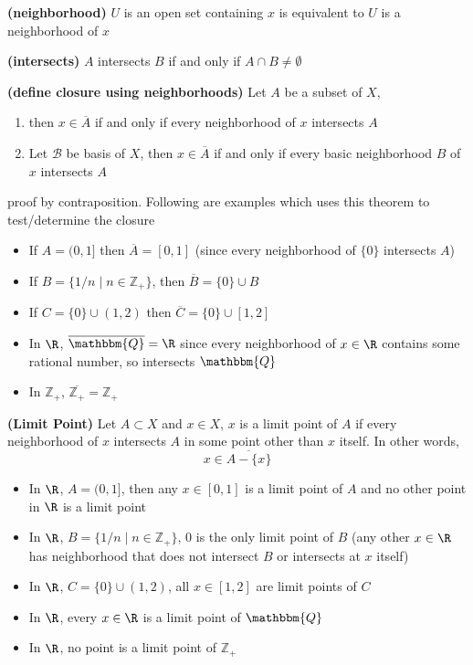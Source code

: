\documentclass[10.5pt]{article}
\newcommand{\Z}{\mathbb{Z}}
\newcommand{\calB}{\mathcal{B}}
\newcommand{\Q}{\mathbbm{Q}}
\begin{document}
\begin{defn*}
    \textbf{(neighborhood)} $U$ is an open set containing $x$ is equivalent to $U$ is a neighborhood of $x$ 
\end{defn*}

\begin{defn*}
    \textbf{(intersects)} $A$ intersects $B$ if and only if $A\cap B\neq \emptyset$
\end{defn*}

\begin{theorem*} \textbf{(define closure using neighborhoods)}
    Let $A$ be a subset of $X$,
    \begin{enumerate}
        \item then $x\in \overline{A}$ if and only if every neighborhood of $x$ intersects $A$
        \item Let $\calB$ be basis of $X$, then $x\in \overline{A}$ if and only if every basic neighborhood $B$ of $x$ intersects $A$
    \end{enumerate}
    proof by contraposition. Following are examples which uses this theorem to test/determine the closure
    \begin{itemize}
        \item If $A=(0,1]$ then $\overline{A}=[0,1]$ (since every neighborhood of $\{0\}$ intersects $A$)
        \item If $B = \{1/n \mid n\in \Z_+\}$, then $\overline{B} = \{0\} \cup B$
        \item If $C=\{0\} \cup (1,2)$ then $\overline{C} = \{0\} \cup [1,2]$
        \item In $\R$, $\overline{\Q} = \R$ since every neighborhood of $x\in \R$ contains some rational number, so intersects $\Q$
        \item In $\Z_+$, $\overline{\Z_+} = \Z_+$
    \end{itemize}
\end{theorem*}

\begin{defn*}
    \textbf{(Limit Point)} Let $A\subset X$ and $x\in X$, $x$ is a limit point of $A$ if every neighborhood of $x$ intersects $A$ in some point other than $x$ itself. In other words,
    \[
        x \in \overline{A - \{x\}}
    \]
    \begin{itemize}
        \item In $\R$, $A=(0,1]$, then any $x\in [0,1]$ is a limit point of $A$ and no other point in $\R$ is a limit point
        \item In $\R$, $B = \{1/n \mid n\in \Z_+\}$, 0 is the only limit point of $B$ (any other $x\in \R$ has neighborhood that does not intersect $B$ or intersects at $x$ itself)
        \item In $\R$, $C=\{0\} \cup (1,2)$, all $x\in [1,2]$ are limit points of $C$
        \item In $\R$, every $x\in \R$ is a limit point of $\Q$
        \item In $\R$, no point is a limit point of $\Z_+$
    \end{itemize}
\end{defn*}
\end{document}
